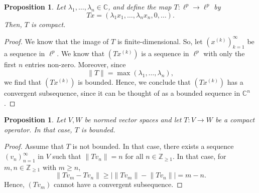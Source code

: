\documentclass[a4paper, openany]{memoir}
\theoremstyle{definition}
\theoremstyle{plain}
\newtheorem{proposition}[definition]{Proposition}
\begin{document}
    \begin{proposition}
        Let $\lambda_1, \dots, \lambda_n \in \mathbb{C}$, and define the map $T \colon \ell^p \to \ell^p$ by
        \[Tx = (\lambda_1 x_1, \dots, \lambda_n x_n, 0, \dots).\]
        Then, $T$ is compact.
    \end{proposition}
    \begin{proof}
        We know that the image of $T$ is finite-dimensional. So, let $(x^{(k)})_{k=1}^\infty$ be a sequence in $\ell^p$. We know that $(Tx^{(k)})$ is a sequence in $\ell^p$ with only the first $n$ entries non-zero. Moreover, since 
        \[\lVert T \rVert = \max(\lambda_1, \dots, \lambda_n),\]
        we find that $(Tx^{(k)})$ is bounded. Hence, we conclude that $(Tx^{(k)})$ has a convergent subsequence, since it can be thought of as a bounded sequence in $\mathbb{C}^n$.
    \end{proof}

    \begin{proposition}
        Let $V, W$ be normed vector spaces and let $T \colon V \to W$ be a compact operator. In that case, $T$ is bounded.
    \end{proposition}
    \begin{proof}
        Assume that $T$ is not bounded. In that case, there exists a sequence $(v_n)_{n=1}^\infty$ in $V$ such that $\lVert Tv_n \rVert = n$ for all $n \in \mathbb{Z}_{\geq 1}$. In that case, for $m, n \in \mathbb{Z}_{\geq 1}$ with $m \geq n$,
        \[\lVert Tv_m - Tv_n \rVert \geq |\lVert Tv_m \rVert - \lVert Tv_n \rVert| = m - n.\]
        Hence, $(Tv_m)$ cannot have a convergent subsequence.
    \end{proof}
\end{document}
